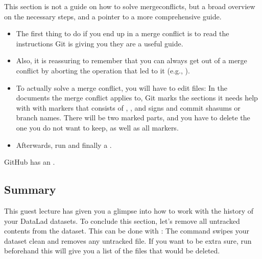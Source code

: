 \sphinxAtStartPar
This section is not a guide on how to solve merge\sphinxhyphen{}conflicts, but a broad
overview on the necessary steps, and a pointer to a more comprehensive guide.
\begin{itemize}
\item {} 
\sphinxAtStartPar
The first thing to do if you end up in a merge conflict is
to read the instructions Git is giving you \textendash{} they are a useful guide.

\item {} 
\sphinxAtStartPar
Also, it is reassuring to remember that you can always get out of
a merge conflict by aborting the operation that led to it (e.g.,
).

\item {} 
\sphinxAtStartPar
To actually solve a merge conflict, you will have to edit files: In the
documents the merge conflict applies to, Git marks the sections it needs
help with with markers that consists of \sphinxcode{\sphinxupquote{\textgreater{}}}, \sphinxcode{\sphinxupquote{\textless{}}}, and \sphinxcode{\sphinxupquote{=}}
signs and commit shasums or branch names.
There will be two marked parts, and you have to delete the one you do not
want to keep, as well as all markers.

\item {} 
\sphinxAtStartPar
Afterwards, run  and finally a .

\end{itemize}

\sphinxAtStartPar
GitHub has an .


\subsection{Summary}
\label{\detokenize{basics/101-137-history:summary}}
\sphinxAtStartPar
This guest lecture has given you a glimpse into how to work with the
history of your DataLad datasets.
To conclude this section, let’s remove all untracked contents from
the dataset. This can be done with : The command
 swipes your dataset clean and removes any untracked
file.
If you want to be extra sure, run  beforehand \textendash{} this will
give you a list of the files that would be deleted.

